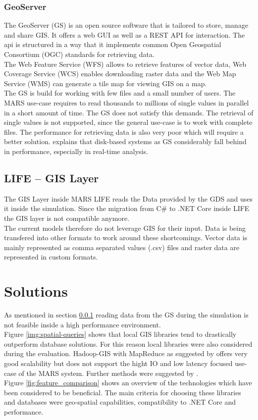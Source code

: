 \subsubsection{GeoServer} \label{sec:GS}
The GeoServer (GS) is an open source software that is tailored to store, manage and share GIS. It offers a web GUI as well as a REST API for interaction. The api is structured in a way that it implements common Open Geospatial Consortium (OGC) standards for retrieving data.\\
The Web Feature Service (WFS) allows to retrieve features of vector data, Web Coverage Service (WCS) enables downloading raster data and the Web Map Service (WMS) can generate a tile map for viewing GIS on a map.\\
The GS is build for working with few files and a small number of users. The MARS use-case requires to read thousands to millions of  single values in parallel in a short amount of time. The GS does not satisfy this demands. The retrieval of single values is not supported, since the general use-case is to work with complete files. The performance for retrieving data is also very poor which will require a better solution. \cite{Pandey2016} explains that disk-based systems as GS considerably fall behind in performance, especially in real-time  analysis.


\subsection{LIFE -- GIS Layer}
The GIS Layer inside MARS LIFE reads the Data provided by the GDS and uses it inside the simulation. Since the migration from C\# to .NET Core inside LIFE the GIS layer is not compatible anymore.\\
The current models therefore do not leverage GIS for their input. Data is being transfered into other formats to work around these shortcomings. Vector data is mainly represented as comma separated values (.csv) files and raster data are represented in custom formats.


\section{Solutions}
As mentioned in section \ref{sec:GS} reading data from the GS during the simulation is not feasible inside a high performance environment.\\
Figure \ref{img:spatial-queries} shows that local GIS libraries tend to drastically outperform database solutions. For this reason local libraries were also considered during the evaluation. Hadoop-GIS with MapReduce as suggested by \cite{Wang2011} offers very good scalability but does not support the hight IO and low latency focused use-case of the MARS system. Further methods were suggested by \cite{Pavlo2009}.\\
Figure \ref{fig:feature_comparison} shows an overview of the technologies which have been considered to be beneficial. The main criteria for choosing these libraries and databases were geo-spatial capabilities, compatibility to .NET Core and performance.

